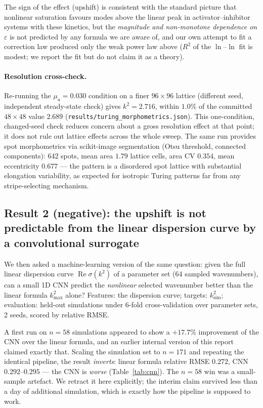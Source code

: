 The sign of the effect (upshift) is consistent with the standard picture that
nonlinear saturation favours modes above the linear peak in
activator--inhibitor systems with these kinetics, but the \emph{magnitude and
non-monotone dependence on $\varepsilon$} is not predicted by any formula we
are aware of, and our own attempt to fit a correction law produced only the
weak power law above ($R^2$ of the $\ln$--$\ln$ fit is modest; we report the
fit but do not claim it as a theory).

\paragraph{Resolution cross-check.} Re-running the $\mu_a = 0.030$ condition
on a finer $96 \times 96$ lattice (different seed, independent steady-state
check) gives $k^2 = 2.716$, within $1.0\%$ of the committed $48 \times 48$
value $2.689$ (\texttt{results/turing\_morphometrics.json}). This one-condition, changed-seed check reduces concern about a gross resolution effect at that point; it does not rule out lattice effects across the whole sweep. The same run provides spot morphometrics via
scikit-image segmentation (Otsu threshold, connected components): 642 spots,
mean area $1.79$ lattice cells, area CV $0.354$, mean eccentricity $0.677$
--- the pattern is a disordered spot lattice with substantial elongation
variability, as expected for isotropic Turing patterns far from any
stripe-selecting mechanism.

\subsection{Result 2 (negative): the upshift is not predictable from the linear
dispersion curve by a convolutional surrogate}
\label{sec:cnnsurr}

We then asked a machine-learning version of the same question: given the full
linear dispersion curve $\operatorname{Re}\sigma(k^2)$ of a parameter set
(64 sampled wavenumbers), can a small 1D CNN predict the
\emph{nonlinear} selected wavenumber better than the linear formula
$k^2_{\max}$ alone? Features: the dispersion curve; targets:
$k^2_{\mathrm{sim}}$; evaluation: held-out simulations under 6-fold
cross-validation over parameter sets, 2 seeds, scored by relative RMSE.

A first run on $n = 58$ simulations appeared to show a $+17.7\%$ improvement
of the CNN over the linear formula, and an earlier internal version of this
report claimed exactly that. Scaling the simulation set to $n = 171$ and
repeating the identical pipeline, the result \emph{inverts}: linear formula
relative RMSE $0.272$, CNN $0.292$--$0.295$ --- the CNN is \emph{worse}
(Table~\ref{tab:cnn}). The $n = 58$ win was a small-sample artefact. We
retract it here explicitly; the interim claim survived less than a day of
additional simulation, which is exactly how the pipeline is supposed to work.

